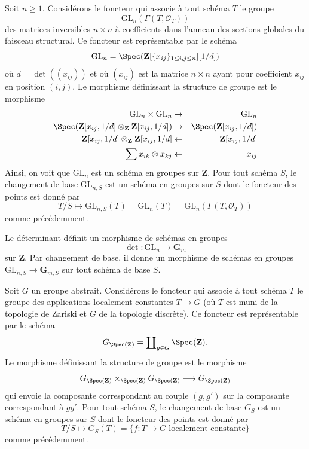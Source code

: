 \begin{example}
\label{example-general-linear-group}
Soit $n \geq 1$.
Considérons le foncteur qui associe
à tout schéma $T$ le groupe
$$
\text{GL}_n(\Gamma(T, \mathcal{O}_T))
$$
des matrices inversibles $n \times n$ à coefficients dans
l'anneau des sections globales du faisceau structural.
Ce foncteur est représentable par le schéma
$$
\text{GL}_n = \Spec(\mathbf{Z}[\{x_{ij}\}_{1 \leq i, j \leq n}][1/d])
$$
où $d = \det((x_{ij}))$ et où $(x_{ij})$ est la matrice $n \times n$
ayant pour coefficient $x_{ij}$ en position $(i, j)$.
Le morphisme définissant la structure de groupe est le morphisme
\begin{eqnarray*}
\text{GL}_n \times \text{GL}_n & \to & \text{GL}_n \\
\Spec(\mathbf{Z}[x_{ij}, 1/d] \otimes_{\mathbf{Z}}
\mathbf{Z}[x_{ij}, 1/d])
& \to &
\Spec(\mathbf{Z}[x_{ij}, 1/d]) \\
\mathbf{Z}[x_{ij}, 1/d] \otimes_{\mathbf{Z}} \mathbf{Z}[x_{ij}, 1/d]
& \leftarrow &
\mathbf{Z}[x_{ij}, 1/d] \\
\sum x_{ik} \otimes x_{kj} & \leftarrow & x_{ij}
\end{eqnarray*}
Ainsi, on voit que $\text{GL}_n$ est un schéma en groupes sur $\mathbf{Z}$.
Pour tout schéma $S$, le changement de base $\text{GL}_{n, S}$ est un
schéma en groupes sur $S$ dont le foncteur des points est donné par
$$
T/S
\longmapsto
\text{GL}_{n, S}(T) = \text{GL}_n(T) =\text{GL}_n(\Gamma(T, \mathcal{O}_T))
$$
comme précédemment.
\end{example}

\begin{example}
\label{example-determinant}
Le déterminant définit un morphisme de schémas en groupes
$$
\det : \text{GL}_n \longrightarrow \mathbf{G}_m
$$
sur $\mathbf{Z}$. Par changement de base, il donne un morphisme
de schémas en groupes $\text{GL}_{n, S} \to \mathbf{G}_{m, S}$
sur tout schéma de base $S$.
\end{example}

\begin{example}
\label{example-constant-group}
Soit $G$ un groupe abstrait. Considérons le foncteur
qui associe à tout schéma $T$ le groupe
des applications localement constantes $T \to G$ (où $T$ est muni de la topologie de Zariski
et $G$ de la topologie discrète). Ce foncteur est représentable par le schéma
$$
G_{\Spec(\mathbf{Z})} =
\coprod\nolimits_{g \in G} \Spec(\mathbf{Z}).
$$
Le morphisme définissant la structure de groupe est le morphisme
$$
G_{\Spec(\mathbf{Z})}
\times_{\Spec(\mathbf{Z})}
G_{\Spec(\mathbf{Z})}
\longrightarrow
G_{\Spec(\mathbf{Z})}
$$
qui envoie la composante correspondant au couple $(g, g')$ sur la
composante correspondant à $gg'$. Pour tout schéma $S$, le changement de base
$G_S$ est un schéma en groupes sur $S$ dont le foncteur des points est donné par
$$
T/S
\longmapsto
G_S(T) = \{f : T \to G \text{ localement constante}\}
$$
comme précédemment.
\end{example}





